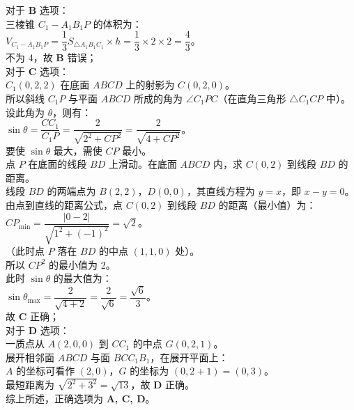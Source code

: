 {  对于 \textbf{B} 选项：\\
  三棱锥 \(C_1 - A_1B_1P\) 的体积为：\\
  \(V_{C_1-A_1B_1P} = \dfrac{1}{3} S_{\triangle A_1B_1C_1} \times h = \dfrac{1}{3} \times 2 \times 2 = \dfrac{4}{3}\)。\\
  不为 4，故 \textbf{B} 错误；\\
  对于 \textbf{C} 选项：\\
  \(C_1(0,2,2)\) 在底面 \(ABCD\) 上的射影为 \(C(0,2,0)\)。\\
  所以斜线 \(C_1P\) 与平面 \(ABCD\) 所成的角为 \(\angle C_1PC\)（在直角三角形 \(\triangle C_1CP\) 中）。\\
  设此角为 \(\theta\)，则有：\\
  \(\sin\theta = \dfrac{CC_1}{C_1P} = \dfrac{2}{\sqrt{2^2 + CP^2}} = \dfrac{2}{\sqrt{4 + CP^2}}\)。\\
  要使 \(\sin\theta\) 最大，需使 \(CP\) 最小。\\
  点 \(P\) 在底面的线段 \(BD\) 上滑动。在底面 \(ABCD\) 内，求 \(C(0,2)\) 到线段 \(BD\) 的距离。\\
  线段 \(BD\) 的两端点为 \(B(2,2)\)，\(D(0,0)\)，其直线方程为 \(y = x\)，即 \(x - y = 0\)。\\
  由点到直线的距离公式，点 \(C(0,2)\) 到线段 \(BD\) 的距离（最小值）为：\\
  \(CP_{\min} = \dfrac{|0 - 2|}{\sqrt{1^2 + (-1)^2}} = \sqrt{2}\)。\\
  （此时点 \(P\) 落在 \(BD\) 的中点 \((1,1,0)\) 处）。\\
  所以 \(CP^2\) 的最小值为 2。\\
  此时 \(\sin\theta\) 的最大值为：\\
  \(\sin\theta_{\max} = \dfrac{2}{\sqrt{4 + 2}} = \dfrac{2}{\sqrt{6}} = \dfrac{\sqrt{6}}{3}\)。\\
  故 \textbf{C} 正确；\\
  对于 \textbf{D} 选项：\\
  一质点从 \(A(2,0,0)\) 到 \(CC_1\) 的中点 \(G(0,2,1)\)。\\
  展开相邻面 \(ABCD\) 与面 \(BCC_1B_1\)，在展开平面上：\\
  \(A\) 的坐标可看作 \((2,0)\)，\(G\) 的坐标为 \((0, 2+1) = (0,3)\)。\\
  最短距离为 \(\sqrt{2^2 + 3^2} = \sqrt{13}\)，故 \textbf{D} 正确。\\
  综上所述，正确选项为 \textbf{A, C, D}。%
}

\newcommand{\qSolidCubeDynamicAngleDiagnosis}{%
  用于课堂精准变式训练。考查正方体截面多边形判定、线面角正弦最大值的动态几何转化（利用投影把角转化为直角三角形内边比）、以及表面爬行最短距离计算。
}

